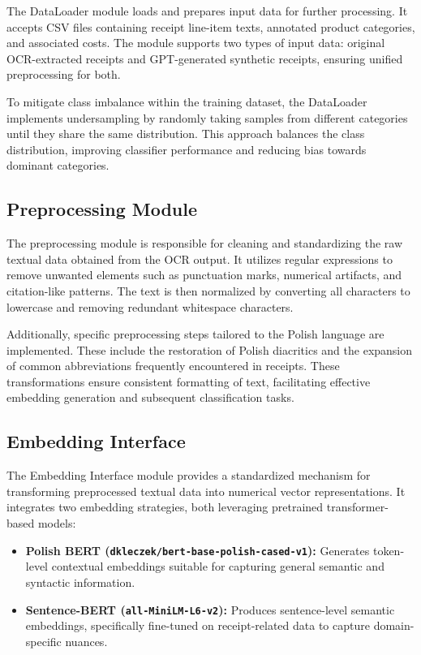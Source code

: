 \documentclass{SGGW-thesis-EN}
\begin{document}
The DataLoader module loads and prepares input data for further processing. It accepts CSV files containing receipt line-item texts,
annotated product categories, and associated costs. The module supports two types of input data: original OCR-extracted receipts and
GPT-generated synthetic receipts, ensuring unified preprocessing for both.

To mitigate class imbalance within the training dataset, the DataLoader implements undersampling by randomly taking samples from different
categories until they share the same distribution. This approach balances the class distribution, improving classifier performance and reducing bias
towards dominant categories.

\subsection{Preprocessing Module}

The preprocessing module is responsible for cleaning and standardizing the raw textual data obtained from the OCR output. It utilizes regular  
expressions to remove unwanted elements such as punctuation marks, numerical artifacts, and citation-like patterns. The text is then  
normalized by converting all characters to lowercase and removing redundant whitespace characters.

Additionally, specific preprocessing steps tailored to the Polish language are implemented. These include the restoration of Polish diacritics  
and the expansion of common abbreviations frequently encountered in receipts. These transformations ensure consistent formatting of text,  
facilitating effective embedding generation and subsequent classification tasks.

\subsection{Embedding Interface}

The Embedding Interface module provides a standardized mechanism for transforming preprocessed textual data into numerical vector representations.  
It integrates two embedding strategies, both leveraging pretrained transformer-based models:

\begin{itemize}
  \item \textbf{Polish BERT (\texttt{dkleczek/bert-base-polish-cased-v1}):} Generates token-level contextual embeddings suitable for capturing  
  general semantic and syntactic information.

  \item \textbf{Sentence-BERT (\texttt{all-MiniLM-L6-v2}):} Produces sentence-level semantic embeddings, specifically fine-tuned on  
  receipt-related data to capture domain-specific nuances.
\end{itemize}
\end{document}
